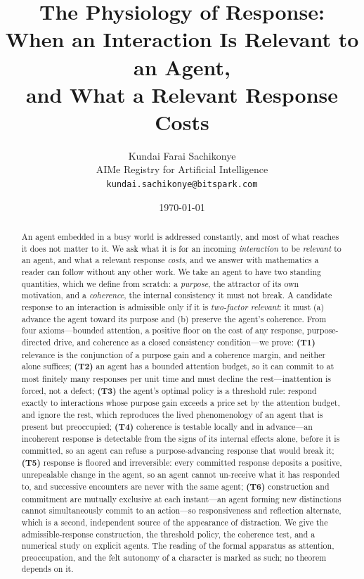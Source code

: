 \documentclass[11pt,twocolumn,a4paper]{article}
\title{\textbf{The Physiology of Response:\\
When an Interaction Is Relevant to an Agent,\\
and What a Relevant Response Costs}}
\author{Kundai Farai Sachikonye\\[2pt]
\small AIMe Registry for Artificial Intelligence\\
\small \texttt{kundai.sachikonye@bitspark.com}}
\date{\today}
\begin{document}
\maketitle

\begin{abstract}
\noindent
An agent embedded in a busy world is addressed constantly, and most of
what reaches it does not matter to it. We ask what it is for an incoming
\emph{interaction} to be \emph{relevant} to an agent, and what a relevant
response \emph{costs}, and we answer with mathematics a reader can follow
without any other work. We take an agent to have two standing quantities,
which we define from scratch: a \emph{purpose}, the attractor of its own
motivation, and a \emph{coherence}, the internal consistency it must not
break. A candidate response to an interaction is admissible only if it is
\emph{two-factor relevant}: it must (a) advance the agent toward its
purpose and (b) preserve the agent's coherence. From four axioms---bounded
attention, a positive floor on the cost of any response, purpose-directed
drive, and coherence as a closed consistency condition---we prove:
\textbf{(T1)} relevance is the conjunction of a purpose gain and a
coherence margin, and neither alone suffices; \textbf{(T2)} an agent has a
bounded attention budget, so it can commit to at most finitely many
responses per unit time and must decline the rest---inattention is
forced, not a defect; \textbf{(T3)} the agent's optimal policy is a
threshold rule: respond exactly to interactions whose purpose gain exceeds
a price set by the attention budget, and ignore the rest, which reproduces
the lived phenomenology of an agent that is present but preoccupied;
\textbf{(T4)} coherence is testable locally and in advance---an
incoherent response is detectable from the signs of its internal effects
alone, before it is committed, so an agent can refuse a purpose-advancing
response that would break it; \textbf{(T5)} response is floored and
irreversible: every committed response deposits a positive, unrepealable
change in the agent, so an agent cannot un-receive what it has responded
to, and successive encounters are never with the same agent;
\textbf{(T6)} construction and commitment are mutually exclusive at each
instant---an agent forming new distinctions cannot simultaneously commit
to an action---so responsiveness and reflection alternate, which is a
second, independent source of the appearance of distraction. We give the
admissible-response construction, the threshold policy, the coherence
test, and a numerical study on explicit agents. The reading of the formal
apparatus as attention, preoccupation, and the felt autonomy of a
character is marked as such; no theorem depends on it.
\end{abstract}
\end{document}
